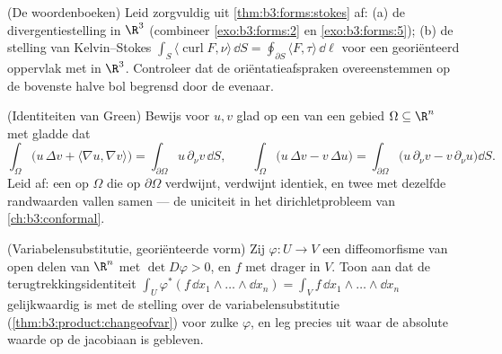 \begin{exercise}[$\star\star$]\label{exo:b3:forms:7}
(De woordenboeken) Leid zorgvuldig uit
\cref{thm:b3:forms:stokes} af: (a) de divergentiestelling in
$\R^3$ (combineer \cref{exo:b3:forms:2} en
\cref{exo:b3:forms:5}); (b) de stelling van Kelvin--Stokes
$\int_S\langle\operatorname{curl}F, \nu\rangle\,\dd S =
\oint_{\partial S}\langle F, \tau\rangle\,\dd\ell$ voor een
 georiënteerd oppervlak met  in $\R^3$. Controleer dat
de oriëntatieafspraken overeenstemmen op de bovenste halve bol
begrensd door de evenaar.
\end{exercise}

\begin{exercise}[$\star\star$]\label{exo:b3:forms:8}
(Identiteiten van Green) Bewijs voor $u, v$ glad op een 
van een  gebied $\Omega \subseteq \R^n$ met gladde 
dat
\[
\int_\Omega\bigl(u\,\Delta v + \langle\nabla u, \nabla
v\rangle\bigr) = \int_{\partial\Omega}u\,\partial_\nu
v\,\dd S,
\qquad
\int_\Omega\bigl(u\,\Delta v - v\,\Delta u\bigr) =
\int_{\partial\Omega}\bigl(u\,\partial_\nu v -
v\,\partial_\nu u\bigr)\dd S .
\]
Leid af: een  op $\Omega$ die op
$\partial\Omega$ verdwijnt, verdwijnt identiek, en twee
 met dezelfde randwaarden vallen samen --- de
uniciteit in het dirichletprobleem van
\cref{ch:b3:conformal}.
\end{exercise}

\begin{exercise}[$\star\star$]\label{exo:b3:forms:9}
(Variabelensubstitutie, georiënteerde vorm) Zij $\varphi\colon U
\to V$ een diffeomorfisme van open delen van $\R^n$ met $\det
D\varphi > 0$, en $f$  met  drager in $V$. Toon
aan dat de terugtrekkingsidentiteit $\int_U\varphi^*(f\,\dd
x_1\wedge\dots\wedge\dd x_n) = \int_Vf\,\dd x_1\wedge\dots\wedge
\dd x_n$ gelijkwaardig is met de stelling over de
variabelensubstitutie (\cref{thm:b3:product:changeofvar}) voor
zulke $\varphi$, en leg precies uit waar de absolute waarde op de
jacobiaan is gebleven.
\end{exercise}

